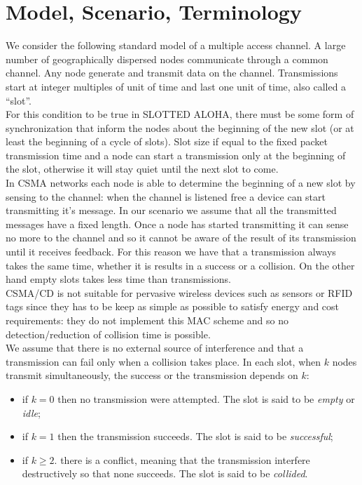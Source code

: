 \documentclass[12pt,a4paper]{report}
\begin{document}
\section{Model, Scenario, Terminology}

We consider the following standard model of a multiple access channel. A large number of geographically dispersed nodes communicate through a common channel. Any node generate and transmit data on the channel. Transmissions start at integer multiples of unit of time and last one unit of time, also called a ``slot''.\\

For this condition to be true in SLOTTED ALOHA, there must be some form of synchronization that inform the nodes about the beginning of the new slot (or at least the beginning of a cycle of slots). Slot size if equal to the fixed packet transmission time and a node can start a transmission only at the beginning of the slot, otherwise it will stay quiet until the next slot to come.\\

In CSMA networks each node is able to determine the beginning of a new slot by sensing to the channel: when the channel is listened free a device can start transmitting it's message. In our scenario we assume that all the transmitted messages have a fixed length. Once a node has started transmitting it can sense no more to the channel and so it cannot be aware of the result of its transmission until it receives feedback. For this reason we have that a transmission always takes the same time, whether it is results in a success or a collision. On the other hand empty slots takes less time than transmissions.\\

CSMA/CD is not suitable for pervasive wireless devices such as sensors or RFID tags since they has to be keep as simple as possible to satisfy energy and cost requirements: they do not implement this MAC scheme and so no detection/reduction of collision time is possible.\\

We assume that there is no external source of interference and that a transmission can fail only when a collision takes place.
In each slot, when $k$ nodes transmit simultaneously, the success or the transmission depends on $k$:
\begin{itemize}
\item if $k=0$ then no transmission were attempted. The slot is said to be \emph{empty} or \emph{idle};
\item if $k=1$ then the transmission succeeds. The slot is said to be \emph{successful};
\item if $k\geq 2$. there is a conflict, meaning that the transmission interfere destructively so that none succeeds. The slot is said to be \emph{collided}.
\end{itemize}
\end{document}
